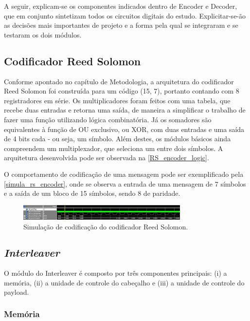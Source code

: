 	A seguir, explicam-se os componentes indicados dentro de Encoder e Decoder, que em conjunto sintetizam todos os circuitos digitais do estudo. Explicitar-se-ão as decisões mais importantes de projeto e a forma pela qual se integraram e se testaram os dois módulos.

	
	\subsection{Codificador Reed Solomon}
	
	Conforme apontado no capítulo de Metodologia, a arquitetura do codificador Reed Solomon foi construída para um código (15, 7), portanto contando com 8 registradores em série. Os multiplicadores foram feitos com uma tabela,  que recebe duas entradas e retorna uma saída, de maneira a simplificar o trabalho de fazer uma função utilizando lógica combinatória. Já os somadores são equivalentes à função de OU exclusivo, ou XOR, com duas entradas e uma saída de 4 bits cada - ou seja, um símbolo. Além destes, os módulos básicos ainda compreendem um multiplexador, que seleciona um entre dois símbolos. A arquitetura desenvolvida pode ser observada na \autoref{RS_encoder_logic}.
	
	O comportamento de codificação de uma mensagem pode ser exemplificado pela \autoref{simula_rs_encoder}, onde se observa a entrada de uma mensagem de 7 símbolos e a saída de um bloco de 15 símbolos, sendo 8 de paridade.
	
	\begin{figure}[h]
		\caption{\label{simula_rs_encoder}Simulação de codificação do codificador Reed Solomon.}
		\centering
		\includegraphics[width=0.76\textwidth, trim={5cm 0 5cm 0}]{RS/Sim_encoder}
	\end{figure}
	
	\subsection{\textit{Interleaver}}

	O módulo do Interleaver é composto por três componentes principais: (i) a memória, (ii) a unidade de controle do cabeçalho e (iii) a unidade de controle do payload.

	\subsubsection{Memória}
	
